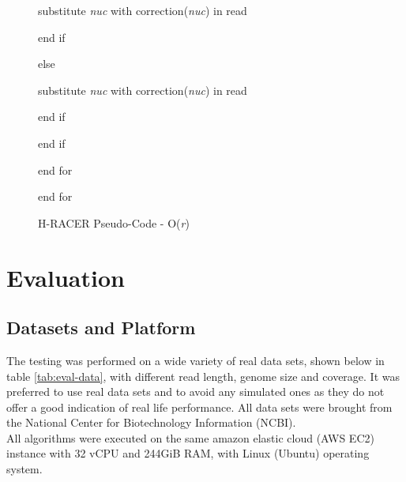 \documentclass{llncs}
\begin{document}
\begin{figure}
\begin{bordered}
\noindent\hspace{18ex}substitute \textit{nuc} with correction(\textit{nuc}) in read

\noindent\hspace{15ex}end if		

\noindent\hspace{12ex}else 

\noindent\hspace{15ex}substitute \textit{nuc} with correction(\textit{nuc}) in read

\noindent\hspace{12ex}end if

\noindent\hspace{9ex}end if

\noindent\hspace{6ex}end for 

\noindent\hspace{3ex}end for 
\end{bordered}
\caption{\label{fig:3}H-RACER Pseudo-Code - O(\textit{r})}
\end{figure}

\section{\label{sec:4}Evaluation}
\subsection{Datasets and Platform}
The testing was performed on a wide variety of real data sets, shown below in table \ref{tab:eval-data}, with different read length, genome size and coverage. It was preferred to use real data sets and to avoid any simulated ones as they do not offer a good indication of real life performance. All data sets were brought from the National Center for Biotechnology Information (NCBI).
\\
All algorithms were executed on the same amazon elastic cloud (AWS EC2) instance with 32 vCPU and 244GiB RAM, with Linux (Ubuntu) operating system.
\end{document}
